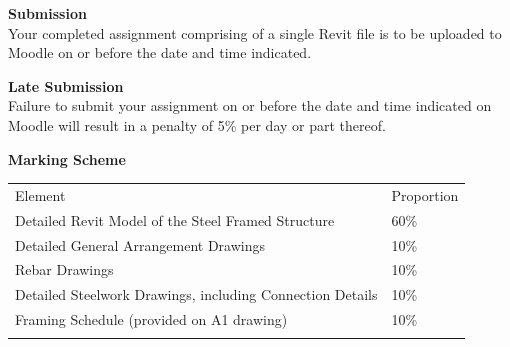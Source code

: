 \newpage


\textbf{Submission}\\
Your completed assignment comprising of a single Revit file is to be uploaded to Moodle on or before the date and time indicated.  

\vspace{0.5cm}

\textbf{Late Submission}\\
Failure to submit your assignment on or before the date and time indicated on Moodle will result in a penalty of 5\% per day or part thereof.

\vspace{0.5cm}
\textbf{Marking Scheme}

\begin{table}[h!]
     \begin{center}
     \begin{tabular}{p{9cm}  p{2cm} }
     \toprule
      \textbf\large{Element} & \textbf\large{Proportion} \\ 
    \cmidrule(r){1-1}\cmidrule(lr){2-2}
    	Detailed Revit Model of the Steel Framed Structure 		 	& 60\%\\
    	Detailed General Arrangement Drawings 						& 10\%\\
        Rebar Drawings 												& 10\%\\
        Detailed Steelwork Drawings, including Connection Details 	& 10\%\\
        Framing Schedule (provided on A1 drawing) 					& 10\%\\
    
      \\ \bottomrule
      \end{tabular}
      \label{tbl:markSchemeAsmt3}
      \end{center}
 \end{table}

